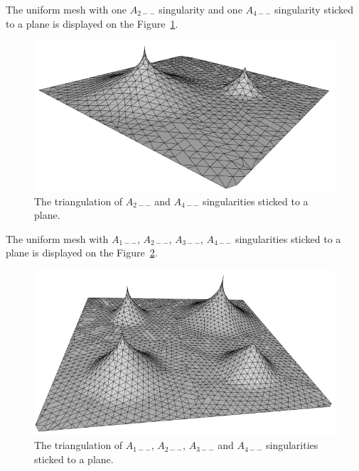 The uniform mesh with one $A_{2--}$ singularity and one $A_{4--}$ singularity
sticked to a plane is displayed on the Figure~\ref{img:86}.

\begin{figure}[h!]
    \centerline{\includegraphics[scale=0.5]{images/img86}}
    \caption[The triangulation of $A_{2--}$ and $A_{4--}$ singularities sticked to a plane]
    {The triangulation of  $A_{2--}$ and $A_{4--}$ singularities sticked to a plane.}
    \label{img:86}
\end{figure}

The uniform mesh with $A_{1--}$, $A_{2--}$, $A_{3--}$, $A_{4--}$ singularities
sticked to a plane is displayed on the Figure~\ref{img:87}.

\begin{figure}[h!]
    \centerline{\includegraphics[scale=0.5]{images/img87}}
    \caption[The triangulation of $A_{1--}$, $A_{2--}$, $A_{3--}$ and $A_{4--}$ singularities sticked to a plane]
    {The triangulation of $A_{1--}$, $A_{2--}$, $A_{3--}$ and $A_{4--}$ singularities sticked to a plane.}
    \label{img:87}
\end{figure}

